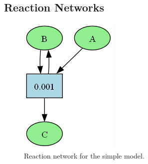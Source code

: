\subsection{Reaction Networks}
\begin{figure}[H]
    \begin{minipage}[t][6cm][t]{.18\textwidth}
        \centering
        \includegraphics[width=\linewidth]{networks/simple.png}
        \caption{Reaction network for the simple model.}
        \label{fig:network_simple}
    \end{minipage}\hfill
    \begin{minipage}[t][6cm][t]{.38\textwidth}
        \centering

\end{minipage}
\end{figure}
